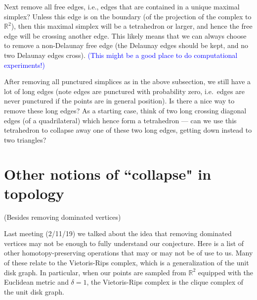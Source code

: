 \documentclass[amscd, amssymb, verbatim]{amsart}[12pt]
\newcommand{\note}[1]{\textcolor{blue}{({#1})}}
\theoremstyle{plain}
\theoremstyle{definition}
\newcommand{\R}{\mathbb{R}}
\begin{document}
Next remove all free edges, i.e., edges that are contained in a unique maximal simplex?
Unless this edge is on the boundary (of the projection of the complex to $\R^2$), then this maximal simplex will be a tetrahedron or larger, and hence the free edge will be crossing another edge.
This likely means that we can always choose to remove a non-Delaunay free edge (the Delaunay edges should be kept, and no two Delaunay edges cross).
\note{This might be a good place to do computational experiments!}

After removing all punctured simplices as in the above subsection, we still have a lot of long edges (note edges are punctured with probability zero, i.e.\ edges are never punctured if the points are in general position).
Is there a nice way to remove these long edges?
As a starting case, think of two long crossing diagonal edges (of a quadrilateral) which hence form a tetrahedron --- can we use this tetrahedron to collapse away one of these two long edges, getting down instead to two triangles?



\section{Other notions of ``collapse" in topology}\label{sec:collapse}

(Besides removing dominated vertices)

Last meeting (2/11/19) we talked about the idea that removing dominated vertices may not be enough to fully understand our conjecture. Here is a list of other homotopy-preserving operations that may or may not be of use to us. Many of these relate to the Vietoris-Rips complex, which is a generalization of the unit disk graph. In particular, when our points are sampled from $\R^2$ equipped with the Euclidean metric and $\delta=1$, the Vietoris-Rips complex is the clique complex of the unit disk graph.
\end{document}
